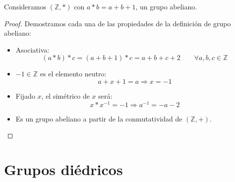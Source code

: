 \begin{ejercicio*}
    Consideramos $(\mathbb{Z},\ast)$ con $a\ast b = a + b + 1$, un grupo abeliano.
    \begin{proof}
        Demostramos cada una de las propiedades de la definición de grupo abeliano:
        \begin{itemize}
            \item Asociativa:
            \begin{equation*}
                (a\ast b) \ast c = (a+b+1) \ast c = a + b + c + 2 \qquad \forall a,b,c\in \mathbb{Z}
            \end{equation*}
            \item $-1\in \mathbb{Z}$ es el elemento neutro:
                \begin{equation*}
                    a + x + 1 = a \Longrightarrow x = -1
                \end{equation*}
            \item Fijado $x$, el simétrico de $x$ será:
                \begin{equation*}
                    x \ast x^{-1} = -1 \Longrightarrow a^{-1} = -a-2
                \end{equation*}
            \item Es un grupo abeliano a partir de la conmutatividad de $(\mathbb{Z},+)$.
        \end{itemize}
    \end{proof}
\end{ejercicio*}

\section{Grupos diédricos}


